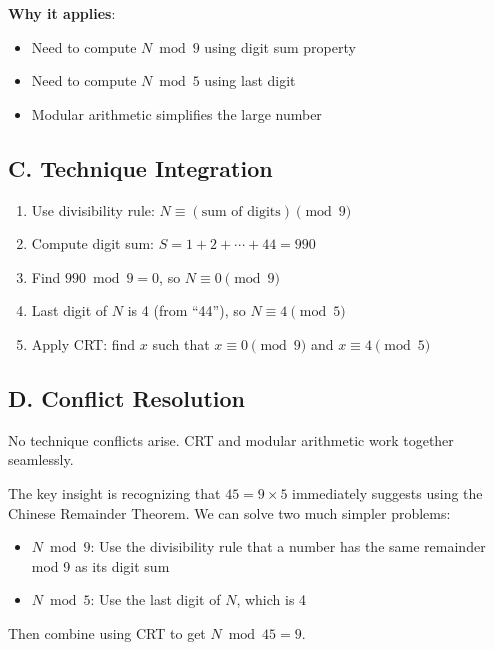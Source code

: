 \documentclass[11pt]{article}
\begin{document}
\begin{techniquesbox}
\textbf{Why it applies}:
\begin{itemize}
    \item Need to compute $N \bmod 9$ using digit sum property
    \item Need to compute $N \bmod 5$ using last digit
    \item Modular arithmetic simplifies the large number
\end{itemize}

\subsection*{C. Technique Integration}
\begin{enumerate}
    \item Use divisibility rule: $N \equiv (\text{sum of digits}) \pmod{9}$
    \item Compute digit sum: $S = 1+2+\cdots+44 = 990$
    \item Find $990 \bmod 9 = 0$, so $N \equiv 0 \pmod{9}$
    \item Last digit of $N$ is 4 (from ``44''), so $N \equiv 4 \pmod{5}$
    \item Apply CRT: find $x$ such that $x \equiv 0 \pmod{9}$ and $x \equiv 4 \pmod{5}$
\end{enumerate}

\subsection*{D. Conflict Resolution}
No technique conflicts arise. CRT and modular arithmetic work together seamlessly.
\end{techniquesbox}

\begin{keyinsightbox}
The key insight is recognizing that $45 = 9 \times 5$ immediately suggests using the Chinese Remainder Theorem. We can solve two much simpler problems:
\begin{itemize}
    \item $N \bmod 9$: Use the divisibility rule that a number has the same remainder mod 9 as its digit sum
    \item $N \bmod 5$: Use the last digit of $N$, which is 4
\end{itemize}
Then combine using CRT to get $N \bmod 45 = 9$.
\end{keyinsightbox}
\end{document}

